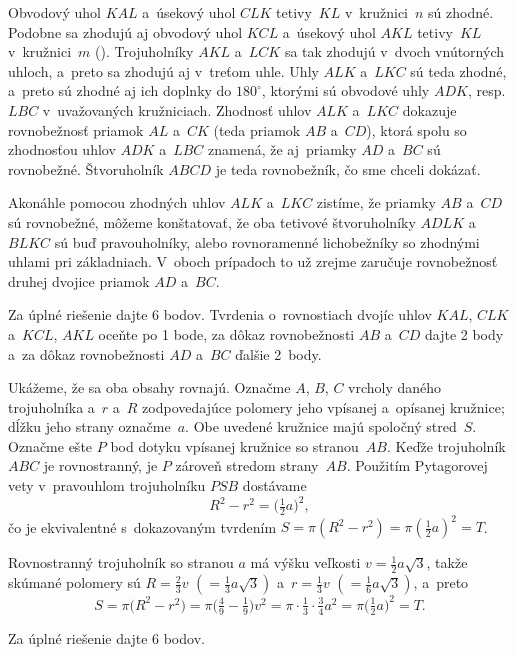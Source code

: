 {%
Obvodový uhol $KAL$ a~úsekový uhol $CLK$ tetivy~$KL$ v~kružnici~$n$ sú
zhodné. Podobne sa zhodujú aj obvodový uhol $KCL$ a~úsekový uhol $AKL$
tetivy~$KL$ v~kružnici~$m$ (\obr). Trojuholníky $AKL$ a~$LCK$ sa tak zhodujú v~dvoch
vnútorných uhloch, a~preto sa zhodujú aj v~treťom uhle.
Uhly $ALK$ a~$LKC$ sú teda zhodné, a~preto sú zhodné
aj ich doplnky do $180^{\circ}$, ktorými sú obvodové uhly
$ADK$, resp. $LBC$ v~uvažovaných kružniciach. Zhodnosť uhlov $ALK$ a~$LKC$
dokazuje rovnobežnosť priamok $AL$ a~$CK$ (teda priamok $AB$
a~$CD$), ktorá spolu so zhodnosťou uhlov $ADK$ a~$LBC$ znamená, že
aj~priamky $AD$ a~$BC$ sú rovnobežné. Štvoruholník $ABCD$ je teda rovnobežník,
čo sme chceli dokázať.
%

\poznamka
Akonáhle pomocou zhodných uhlov $ALK$ a~$LKC$
zistíme, že priamky $AB$ a~$CD$ sú rovnobežné, môžeme
konštatovať, že oba tetivové štvoruholníky $ADLK$ a~$BLKC$
sú buď pravouholníky, alebo rovnoramenné lichobežníky so
zhodnými uhlami pri základniach. V~oboch prípadoch to už
zrejme zaručuje rovnobežnosť druhej dvojice priamok
$AD$ a~$BC$.

\nobreak\medskip\petit\noindent
Za úplné riešenie dajte 6 bodov. Tvrdenia o~rovnostiach dvojíc uhlov
$KAL$, $CLK$ a~$KCL$, $AKL$ oceňte po 1 bode, za dôkaz rovnobežnosti $AB$
a~$CD$ dajte 2 body a~za dôkaz rovnobežnosti $AD$ a~$BC$ ďalšie 2~body.
\endpetit}

{%
Ukážeme, že sa oba obsahy rovnajú.
Označme $A$, $B$, $C$ vrcholy daného trojuholníka a~$r$ a~$R$ zodpovedajúce
polomery jeho vpísanej a~opísanej kružnice; dĺžku jeho strany označme~$a$.
Obe uvedené kružnice majú spoločný stred~$S$. Označme ešte $P$ bod dotyku
vpísanej kružnice so stranou~$AB$. Keďže trojuholník $ABC$
je rovnostranný, je $P$ zároveň stredom strany~$AB$.
Použitím Pytagorovej vety v~pravouhlom trojuholníku $PSB$ dostávame
$$
R^2-r^2=\bigl(\tfrac12a\bigr)^{2},
$$
čo je ekvivalentné s~dokazovaným tvrdením $S=\pi (R^2-r^2)=\pi
\left(\frac12a\right)^2=T$.

\poznamka
Rovnostranný trojuholník so stranou $a$ má výšku veľkosti $v=\frac12a\sqrt3$, takže
skúmané polomery sú $R=\frac23v$ $(=\frac13a\sqrt3)$
a~$r=\frac13v$ $(=\frac16a\sqrt3)$, a~preto
$$
S=\pi\bigl(R^2-r^2\bigr)=\pi\bigl(\tfrac49-\tfrac19)v^2=
\pi\cdot\tfrac13\cdot\tfrac34a^2=\pi\bigl(\tfrac12a\bigr)^2=T.
$$



\nobreak\medskip\petit\noindent
Za úplné riešenie dajte 6 bodov.
\endpetit
\bigbreak}


